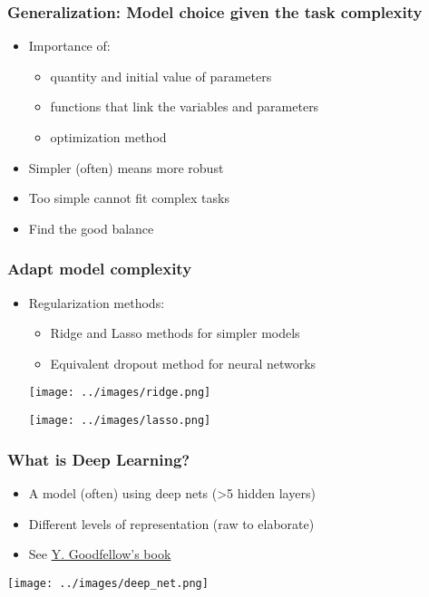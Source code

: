 \begin{frame}[fragile]
   \frametitle{Generalization: Model choice given the task complexity}
   \begin{itemize}
      \item Importance of:
      \begin{itemize}
         \item quantity and initial value of parameters
         \item functions that link the variables and parameters
         \item optimization method
      \end{itemize}
      \item Simpler (often) means more robust
      \item Too simple cannot fit complex tasks
      \item Find the good balance
   \end{itemize}
\end{frame}


\begin{frame}[fragile]
   \frametitle{Adapt model complexity}
   \begin{itemize}
      \item Regularization methods:
      \begin{itemize}
         \item Ridge and Lasso methods for simpler models
         \item Equivalent dropout method for neural networks
      \end{itemize}
      \begin{center}
         \texttt{[image: ../images/ridge.png]}
      \end{center}
      \begin{center}
         \texttt{[image: ../images/lasso.png]}
      \end{center}
   \end{itemize}
\end{frame}


\begin{frame}[fragile]
   \frametitle{What is Deep Learning?}
   \begin{itemize}
      \item A model (often) using deep nets (>5 hidden layers)
      \item Different levels of representation (raw to elaborate)
      \item See \href{https://www.deeplearningbook.org/}{Y. Goodfellow's book}
   \end{itemize}
   \begin{center}
      \texttt{[image: ../images/deep\_net.png]}
   \end{center}
\end{frame}


